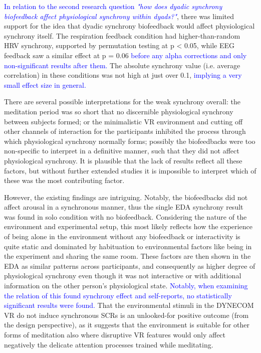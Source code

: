 \documentclass[manuscript, review = false, screen]{acmart}
\begin{document}
\textcolor{blue}{In relation to the second research question \textit{"how does dyadic synchrony biofeedback affect physiological synchrony within dyads?"}}, there was limited support for the idea that dyadic synchrony biofeedback would affect physiological synchrony itself. The respiration feedback condition had higher-than-random HRV synchrony, supported by permutation testing at {p} < 0.05, while EEG feedback saw a similar effect at {p} = 0.06 \textcolor{blue}{before any alpha corrections and only non-significant results after them.} The absolute synchrony value (i.e. average correlation) in these conditions was not high at just over 0.1, \textcolor{blue}{implying a very small effect size in general.}

There are several possible interpretations for the weak synchrony overall: the meditation period was so short that no discernible physiological synchrony between subjects formed; or the minimalistic VR environment and cutting off other channels of interaction for the participants inhibited the process through which physiological synchrony normally forms; possibly the biofeedbacks were too non-specific to interpret in a definitive manner, such that they did not affect physiological synchrony. It is plausible that the lack of results reflect all these factors, but without further extended studies it is impossible to interpret which of these was the most contributing factor.

However, the existing findings are intriguing. Notably, the biofeedbacks did not affect arousal in a synchronous manner, thus the single EDA synchrony result was found in solo condition with no biofeedback. Considering the nature of the environment and experimental setup, this most likely reflects how the experience of being alone in the environment without any biofeedback or interactivity is quite static and dominated by habituation to environmental factors like being in the experiment and sharing the same room. These factors are then shown in the EDA as similar patterns across participants, and consequently as higher degree of physiological synchrony even though it was not interactive or with additional information on the other person's physiological state. \textcolor{blue}{Notably, when examining the relation of this found synchrony effect and self-reports, no statistically significant results were found.} That the environmental stimuli in the DYNECOM VR do not induce synchronous SCRs is an unlooked-for positive outcome (from the design perspective), as it suggests that the environment is suitable for other forms of meditation also where disruptive VR features would only affect negatively the delicate attention processes trained while meditating. 
\end{document}
